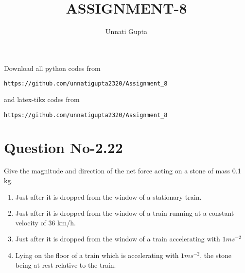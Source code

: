 \documentclass[journal,12pt,twocolumn]{IEEEtran}
\begin{document}
     \def\centbox#1{\makebox[0in]{#1}}
     \def\topbox#1{\raisebox{-\baselineskip}[0in][0in]{#1}}
     \def\midbox#1{\raisebox{-0.5\baselineskip}[0in][0in]{#1}}
\vspace{3cm}
\title{ASSIGNMENT-8}
\author{Unnati Gupta}
\maketitle
\newpage
\bigskip
\renewcommand{\thefigure}{\theenumi}
\renewcommand{\thetable}{\theenumi}
Download all python codes from 
\begin{lstlisting}
https://github.com/unnatigupta2320/Assignment_8
\end{lstlisting}
%
and latex-tikz codes from 
%
\begin{lstlisting}
https://github.com/unnatigupta2320/Assignment_8
\end{lstlisting}
%
\section{Question No-2.22}
Give the magnitude and direction of the net force acting on a stone of mass 0.1 kg.
\begin{enumerate}[label=\alph*.)]
    \item Just after it is dropped from the window of a stationary train.
    \item Just after it is dropped from the window of a train running at a constant velocity of 36 km/h.
    \item Just after it is dropped from the window of a train accelerating with $1 ms^{-2}$
    \item Lying on the floor of a train which is accelerating with $1ms^{-2}$, the stone being at rest relative to the train.
\end{enumerate}
%
\end{document}
